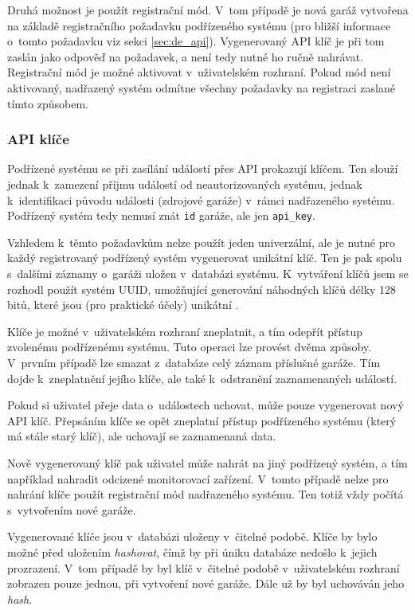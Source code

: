 Druhá možnost je použít registrační mód. V~tom případě je nová garáž vytvořena na základě registračního požadavku podřízeného systému (pro bližší informace o~tomto požadavku viz sekci \ref{sec:de_api}). Vygenerovaný API klíč je při tom zaslán jako odpověď na požadavek, a není tedy nutné ho ručně nahrávat. Registrační mód je možné aktivovat v~uživatelském rozhraní. Pokud mód není aktivovaný, nadřazený systém odmítne všechny požadavky na registraci zaslané tímto způsobem.

\subsubsection{API klíče}
\label{sec:de_apikeys}

Podřízené systému se při zasílání událostí přes API prokazují klíčem. Ten slouží jednak k~zamezení příjmu událostí od neautorizovaných systému, jednak k~identifikaci původu události (zdrojové garáže) v~rámci nadřazeného systému. Podřízený systém tedy nemusí znát \texttt{id} garáže, ale jen \texttt{api\_key}.

Vzhledem k~těmto požadavkům nelze použít jeden univerzální, ale je nutné pro každý registrovaný podřízený systém vygenerovat unikátní klíč. Ten je pak spolu s~dalšími záznamy o~garáži uložen v~databázi systému. K~vytváření klíčů jsem se rozhodl použít systém UUID, umožňující generování náhodných klíčů délky 128 bitů, které jsou (pro praktické účely) unikátní \cite{rfc4122}.

Klíče je možné v~uživatelském rozhraní zneplatnit, a tím odepřít přístup zvolenému podřízenému systému. Tuto operaci lze provést dvěma způsoby. V~prvním případě lze smazat z~databáze celý záznam příslušné garáže. Tím dojde k~zneplatnění jejího klíče, ale také k~odstranění zaznamenaných událostí.

Pokud si uživatel přeje data o~událostech uchovat, může pouze vygenerovat nový API klíč. Přepsáním klíče se opět zneplatní přístup podřízeného systému (který má stále starý klíč), ale uchovají se zaznamenaná data. 

Nově vygenerovaný klíč pak uživatel může nahrát na jiný podřízený systém, a tím například nahradit odcizené monitorovací zařízení. V~tomto případě nelze pro nahrání klíče použít registrační mód nadřazeného systému. Ten totiž vždy počítá s~vytvořením nové garáže.

Vygenerované klíče jsou v~databázi uloženy v~čitelné podobě. Klíče by bylo možné před uložením \textit{hashovat}, čímž by při úniku databáze nedošlo k~jejich prozrazení. V~tom případě by byl klíč v~čitelné podobě v~uživatelském rozhraní zobrazen pouze jednou, při vytvoření nové garáže. Dále už by byl uchováván jeho \textit{hash}.


